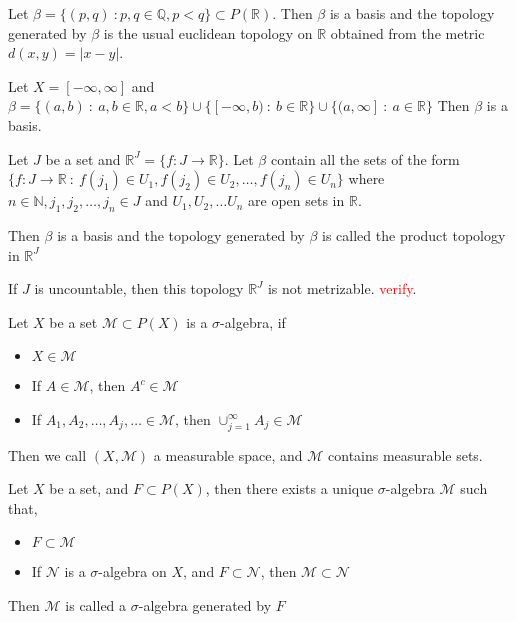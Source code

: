 \begin{example}
  Let $\beta = \{ (p, q) \ : p, q \in \mathbb{ Q}, p < q \} \subset P(\mathbb{R})$. Then $\beta$ is a basis and the topology generated by $\beta$ is the usual euclidean topology on $\mathbb{R}$ obtained from the metric $d(x, y) = |x -y|$.
\end{example}

\begin{example}
  Let $X = [-\infty, \infty]$ and $\beta =  \{ (a, b)  \ : \   a, b \in \mathbb{R}, a< b \} \cup \{ [-\infty, b) \ : \ b \in \mathbb{ R}  \} \cup \{ (a, \infty] \ : \ a \in \mathbb{R} \}$
   Then $\beta$ is a basis.
\end{example}

\begin{example}
  Let $J$ be a set and $\mathbb{R}^J = \{ f : J \to \mathbb{R} \}$. Let $\beta$ contain all the sets of the form $\{ f: J \to \mathbb{R} \ : \ f(j_1) \in U_1, f(j_2) \in U_2 , \ldots, f(j_n) \in U_n \}$ where $ n \in \mathbb{N}, j_1, j_2, \ldots, j_n \in J$ and $ U_1, U_2, \ldots U_n$ are open sets in $ \mathbb{R}$.

  Then $\beta$ is a basis and the topology generated by $\beta$ is called the product topology in $\mathbb{R}^J$

  If $J$ is uncountable, then this topology $ \mathbb{R}^J$ is not metrizable. \textcolor{red}{verify}.
\end{example}

\begin{definition}
  Let $X$ be a set $\mathscr{M} \subset P(X)$ is a $\sigma$-algebra, if 
  \begin{itemize}
    \item $X \in \mathscr{M}$
    \item If $A \in \mathscr{M}$, then $ A^c \in \mathscr{M}$
    \item If $A_1, A_2, \ldots, A_j, \ldots \in \mathscr{M}$, then $\cup_{j = 1}^{\infty} A_j \in \mathscr{M}$
  \end{itemize}
  Then we call $(X, \mathscr{M})$ a measurable space, and $\mathscr{M}$ contains measurable sets.
\end{definition}

\begin{theorem}
  \label{thm:sigma_algeba_generated}
  Let $X$ be a set, and $F \subset P(X)$, then there exists a unique $ \sigma$-algebra $\mathscr{M}$ such that,
  \begin{itemize}
    \item $F \subset \mathscr{M}$
    \item If $\mathscr{N}$ is a $\sigma$-algebra on $X$, and $F \subset \mathscr{N}$, then $\mathscr{M} \subset \mathscr{N}$
  \end{itemize}
  Then $  \mathscr{M}$ is called a $\sigma$-algebra generated by $F$
\end{theorem}












